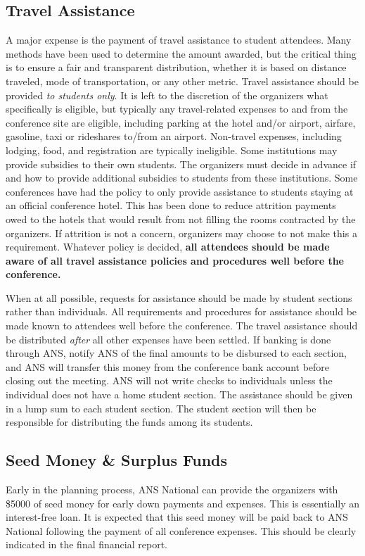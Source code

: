 \documentclass[12pt]{article}
\begin{document}
\subsection{Travel Assistance}
A major expense is the payment of travel assistance to student attendees.
Many methods have been used to determine the amount awarded, but the critical thing is to ensure a fair and transparent distribution, whether it is based on distance traveled, mode of transportation, or any other metric.
Travel assistance should be provided \emph{to students only}.
It is left to the discretion of the organizers what specifically is eligible, but typically any travel-related expenses to and from the conference site are eligible, including parking at the hotel and/or airport, airfare, gasoline, taxi or rideshares to/from an airport.
Non-travel expenses, including lodging, food, and registration are typically  ineligible.
Some institutions may provide subsidies to their own students.
The organizers must decide in advance if and how to provide additional subsidies to students from these institutions.
Some conferences have had the policy to only provide assistance to students staying at an official conference hotel.
This has been done to reduce attrition payments owed to the hotels that would result from not filling the rooms contracted by the organizers.
If attrition is not a concern, organizers may choose to not make this a requirement.
Whatever policy is decided, \textbf{all attendees should be made aware of all travel assistance policies and procedures well before the conference.}

When at all possible, requests for assistance should be made by student sections rather than individuals.
All requirements and procedures for assistance should be made known to attendees well before the conference.
The travel assistance should be distributed \emph{after} all other expenses have been settled.
If banking is done through ANS, notify ANS of the final amounts to be disbursed to each section, and ANS will transfer this money from the conference bank account before closing out the meeting.
ANS will not write checks to individuals unless the individual does not have a home student section.
The assistance should be given in a lump sum to each student section.
The student section will then be responsible for distributing the funds among its students.

\subsection{Seed Money \& Surplus Funds}
Early in the planning process, ANS National can provide the organizers with \$5000 of seed money for early down payments and expenses.
This is essentially an interest-free loan.
It is expected that this seed money will be paid back to ANS National following the payment of all conference expenses.
This should be clearly indicated in the final financial report.
\end{document}
